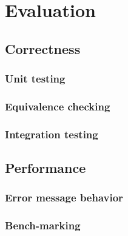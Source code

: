 
\chapter{\label{chap:evaluation}Evaluation}

\section{Correctness}

\subsection{Unit testing}

\subsection{Equivalence checking}

\subsection{Integration testing}

\section{Performance}

\subsection{Error message behavior}

\subsection{Bench-marking}